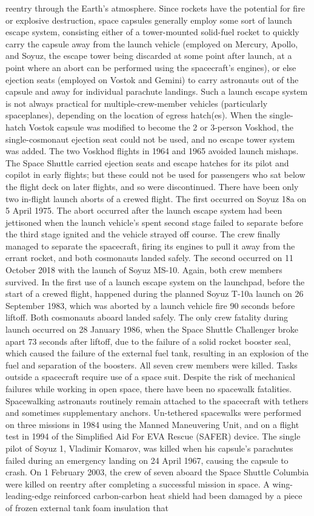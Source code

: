 \documentclass[12pt]{article}
\begin{document}
reentry through the Earth's atmosphere. Since rockets have the potential for fire or explosive destruction, space capsules generally employ some sort of launch escape system, consisting either of a tower-mounted solid-fuel rocket to quickly carry the capsule away from the launch vehicle (employed on Mercury, Apollo, and Soyuz, the escape tower being discarded at some point after launch, at a point where an abort can be performed using the spacecraft's engines), or else ejection seats (employed on Vostok and Gemini) to carry astronauts out of the capsule and away for individual parachute landings. Such a launch escape system is not always practical for multiple-crew-member vehicles (particularly spaceplanes), depending on the location of egress hatch(es). When the single-hatch Vostok capsule was modified to become the 2 or 3-person Voskhod, the single-cosmonaut ejection seat could not be used, and no escape tower system was added. The two Voskhod flights in 1964 and 1965 avoided launch mishaps. The Space Shuttle carried ejection seats and escape hatches for its pilot and copilot in early flights; but these could not be used for passengers who sat below the flight deck on later flights, and so were discontinued. There have been only two in-flight launch aborts of a crewed flight. The first occurred on Soyuz 18a on 5 April 1975. The abort occurred after the launch escape system had been jettisoned when the launch vehicle's spent second stage failed to separate before the third stage ignited and the vehicle strayed off course. The crew finally managed to separate the spacecraft, firing its engines to pull it away from the errant rocket, and both cosmonauts landed safely. The second occurred on 11 October 2018 with the launch of Soyuz MS-10. Again, both crew members survived. In the first use of a launch escape system on the launchpad, before the start of a crewed flight, happened during the planned Soyuz T-10a launch on 26 September 1983, which was aborted by a launch vehicle fire 90 seconds before liftoff. Both cosmonauts aboard landed safely. The only crew fatality during launch occurred on 28 January 1986, when the Space Shuttle Challenger broke apart 73 seconds after liftoff, due to the failure of a solid rocket booster seal, which caused the failure of the external fuel tank, resulting in an explosion of the fuel and separation of the boosters. All seven crew members were killed. Tasks outside a spacecraft require use of a space suit. Despite the risk of mechanical failures while working in open space, there have been no spacewalk fatalities. Spacewalking astronauts routinely remain attached to the spacecraft with tethers and sometimes supplementary anchors. Un-tethered spacewalks were performed on three missions in 1984 using the Manned Maneuvering Unit, and on a flight test in 1994 of the Simplified Aid For EVA Rescue (SAFER) device. The single pilot of Soyuz 1, Vladimir Komarov, was killed when his capsule's parachutes failed during an emergency landing on 24 April 1967, causing the capsule to crash. On 1 February 2003, the crew of seven aboard the Space Shuttle Columbia were killed on reentry after completing a successful mission in space. A wing-leading-edge reinforced carbon-carbon heat shield had been damaged by a piece of frozen external tank foam insulation that 
\end{document}
